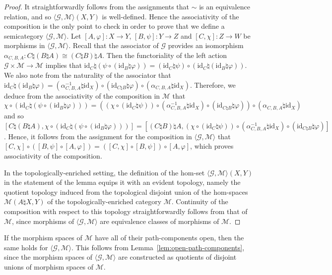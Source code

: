 \documentclass[AHL,Unicode,published]{cedram}
\newcommand{\id}{\mathrm{id}}
\newcommand{\cG}{\mathcal{G}}
\newcommand{\cM}{\mathcal{M}}
\begin{document}
\begin{proof}
It straightforwardly follows from the assignments that $\sim$ is an equivalence relation, and so $\langle \cG,\cM \rangle(X,Y)$ is well-defined. Hence the associativity of the composition is the only point to check in order to prove that we define a semicategory $\langle \cG,\cM \rangle$. Let $[A,\varphi]:X\rightarrow Y$, $[B,\psi] \colon Y\rightarrow Z$ and $[C,\chi] \colon Z\rightarrow W$ be morphisms in $\langle \cG,\cM\rangle $. Recall that the associator of $\cG$ provides an isomorphism $\alpha_{C,B,A}\colon C\natural(B\natural A)\cong (C\natural B)\natural A$. Then the functoriality of the left action $\cG \times \cM \to \cM$ implies that $\id_{C}\natural(\psi\circ(\id_{B}\natural\varphi))= (\id_{C}\natural\psi)\circ(\id_{C}\natural(\id_{B}\natural\varphi))$. We also note from the naturality of the associator that $\id_{C}\natural(\id_{B}\natural\varphi) = (\alpha_{C,B,A}^{-1}\natural\id_{X}) \circ(\id_{C\natural B}\natural\varphi)\circ (\alpha_{C,B,A}\natural\id_{X})$. Therefore, we deduce from the associativity of the composition in $\cM$ that
\[
\chi\circ(\id_{C}\natural(\psi\circ(\id_{B}\natural\varphi))) = \left((\chi\circ(\id_{C}\natural\psi))\circ\left(\alpha_{C,B,A}^{-1}\natural\id_{X}\right)\circ(\id_{C\natural B}\natural\varphi)\right)\circ (\alpha_{C,B,A}\natural\id_{X})
\]
and so $[C\natural(B\natural A),\chi\circ(\id_{C}\natural(\psi\circ(\id_{B}\natural\varphi)))] = [(C\natural B)\natural A,(\chi\circ(\id_{C}\natural\psi))\circ(\alpha_{C,B,A}^{-1}\natural\id_{X})\circ(\id_{C\natural B}\natural\varphi)]$. Hence, it follows from the assignment for the composition in $\langle \cG,\cM \rangle$ that $[C,\chi]\circ([B,\psi]\circ[A,\varphi])=([C,\chi]\circ[B,\psi])\circ[A,\varphi]$, which proves associativity of the composition.

In the topologically-enriched setting, the definition of the hom-set $\langle \cG,\cM \rangle(X,Y)$ in the statement of the lemma equips it with an evident topology, namely the quotient topology induced from the topological disjoint union of the hom-spaces $\cM(A \natural X,Y)$ of the topologically-enriched category $\cM$. Continuity of the composition with respect to this topology straightforwardly follows from that of $\cM$, since morphisms of $\langle \cG,\cM \rangle$ are equivalence classes of morphisms of $\cM$.
\end{proof}

\begin{rema}\label{rmk:open-path-components-Quillen-bracket-construction}
If the morphism spaces of $\cM$ have all of their path-components open, then the same holds for $\langle \cG, \cM \rangle$. This follows from Lemma~\ref{lem:open-path-components}, since the morphism spaces of $\langle \cG, \cM \rangle$ are constructed as quotients of disjoint unions of morphism spaces of $\cM$.
\end{rema}
\end{document}
